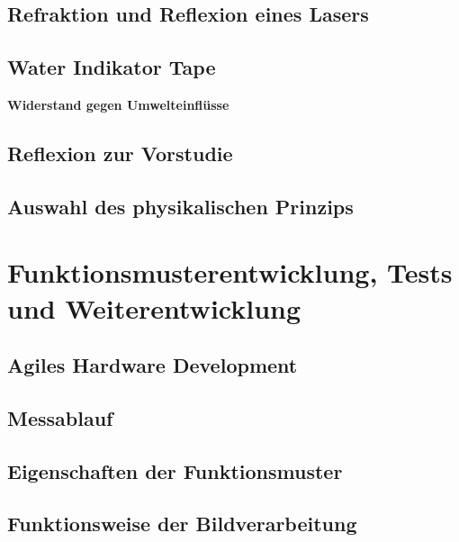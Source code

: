 \documentclass[a4paper,12pt]{article}
\begin{document}
\subsection{Refraktion und Reflexion eines Lasers}


\subsection{Water Indikator Tape}
\label{sec:5559}


\newpage
\textbf{Widerstand gegen Umwelteinflüsse}


\subsection{Reflexion zur Vorstudie}


\newpage
\subsection{Auswahl des physikalischen Prinzips}


\section{Funktionsmusterentwicklung, Tests und Weiterentwicklung}


\subsection{Agiles Hardware Development}


\subsection{Messablauf}
\label{sec:Mess}


\subsection{Eigenschaften der Funktionsmuster}
\label{sec:EigenFunk}


\newpage
\subsection{Funktionsweise der Bildverarbeitung}

\end{document}
